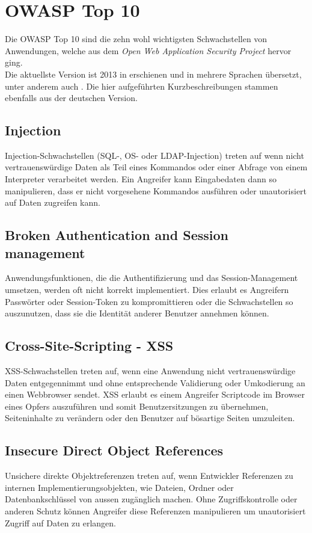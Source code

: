 \section{OWASP Top 10}
Die OWASP Top 10 sind die zehn wohl wichtigsten Schwachstellen von Anwendungen, welche aus dem \textit{Open Web Application Security Project} hervor ging.\\

Die aktuellste Version ist 2013 in  erschienen und in mehrere Sprachen übersetzt, unter anderem auch . Die hier aufgeführten Kurzbeschreibungen stammen ebenfalls aus der deutschen Version.

\subsection{Injection}
Injection-Schwachstellen (SQL-, OS- oder LDAP-Injection) treten auf wenn nicht vertrauenswürdige Daten als Teil eines Kommandos oder einer Abfrage von einem Interpreter verarbeitet werden. Ein Angreifer kann Eingabedaten dann so manipulieren, dass er nicht vorgesehene Kommandos ausführen oder unautorisiert auf Daten zugreifen kann.

\subsection{Broken Authentication and Session management}
Anwendungsfunktionen, die die Authentifizierung und das Session-Management umsetzen, werden oft nicht korrekt implementiert. Dies erlaubt es Angreifern Passwörter oder Session-Token zu kompromittieren oder die Schwachstellen so auszunutzen, dass sie die Identität anderer Benutzer annehmen können.

\subsection{Cross-Site-Scripting - XSS}
XSS-Schwachstellen treten auf, wenn eine Anwendung nicht vertrauenswürdige Daten entgegennimmt und ohne entsprechende Validierung oder Umkodierung an einen Webbrowser sendet. XSS erlaubt es einem Angreifer Scriptcode im Browser eines Opfers auszuführen und somit Benutzersitzungen zu übernehmen, Seiteninhalte zu verändern oder den Benutzer auf bösartige Seiten umzuleiten.

\subsection{Insecure Direct Object References}
Unsichere direkte Objektreferenzen treten auf, wenn Entwickler Referenzen zu internen Implementierungsobjekten, wie Dateien, Ordner oder Datenbankschlüssel von aussen zugänglich machen. Ohne Zugriffskontrolle oder anderen Schutz können Angreifer diese Referenzen manipulieren um unautorisiert Zugriff auf Daten zu erlangen.


